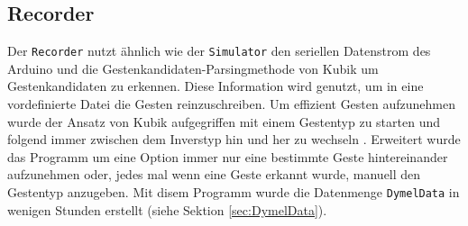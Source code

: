 \subsection{Recorder}
\label{sec:recorder}
Der \texttt{Recorder} nutzt ähnlich wie der \texttt{Simulator} den seriellen Datenstrom des Arduino und die Gestenkandidaten-Parsingmethode von Kubik um Gestenkandidaten zu erkennen. Diese Information wird genutzt, um in
eine vordefinierte Datei die Gesten reinzuschreiben. Um effizient Gesten aufzunehmen wurde der Ansatz von Kubik aufgegriffen mit einem Gestentyp zu starten und folgend immer zwischen dem Inverstyp
hin und her zu wechseln \cite{venzkeArticle}. Erweitert wurde das Programm um eine Option immer nur eine bestimmte Geste hintereinander aufzunehmen oder, jedes mal wenn eine Geste erkannt wurde, manuell den Gestentyp
anzugeben. Mit disem Programm wurde die Datenmenge \texttt{DymelData} in wenigen Stunden erstellt (siehe Sektion \ref{sec:DymelData}).